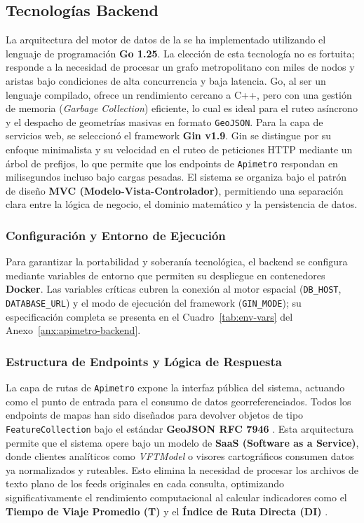 \subsection{Tecnologías Backend}
\label{subsec:backend}
La arquitectura del motor de datos de la \zmvm se ha implementado utilizando el lenguaje de programación \textbf{Go 1.25}. 
La elección de esta tecnología no es fortuita; responde a la necesidad de procesar un grafo metropolitano con miles de nodos y aristas bajo condiciones 
de alta concurrencia y baja latencia. Go, al ser un lenguaje compilado, ofrece un rendimiento cercano a C++, pero con una gestión de memoria (\textit{Garbage Collection}) 
eficiente, lo cual es ideal para el ruteo asíncrono y el despacho de geometrías masivas en formato \texttt{GeoJSON}.
Para la capa de servicios web, se seleccionó el framework \textbf{Gin v1.9}. Gin se distingue por su enfoque minimalista y su velocidad en el ruteo de peticiones HTTP mediante 
un árbol de prefijos, lo que permite que los endpoints de \texttt{Apimetro} respondan en milisegundos incluso bajo cargas pesadas. El sistema se organiza bajo el patrón de diseño 
\textbf{MVC (Modelo-Vista-Controlador)}, permitiendo una separación clara entre la lógica de negocio, el dominio matemático y la persistencia de datos.

\subsubsection{Configuración y Entorno de Ejecución}
\label{subsubsec:configuracionejecucion}

Para garantizar la portabilidad y soberanía tecnológica, el backend se configura mediante variables de entorno que permiten su despliegue en contenedores \textbf{Docker}. Las variables críticas cubren la conexión al motor espacial (\texttt{DB\_HOST}, \texttt{DATABASE\_URL}) y el modo de ejecución del framework (\texttt{GIN\_MODE}); su especificación completa se presenta en el Cuadro~\ref{tab:env-vars} del Anexo~\ref{anx:apimetro-backend}.

\subsubsection{Estructura de Endpoints y Lógica de Respuesta}
\label{subsubsec:estructuraEndpoints}
La capa de rutas de \texttt{Apimetro} expone la interfaz pública del sistema, actuando como el punto de entrada para el consumo de datos georreferenciados. 
Todos los endpoints de mapas han sido diseñados para devolver objetos de tipo \texttt{FeatureCollection} bajo el estándar \textbf{GeoJSON RFC 7946} \parencite{cabrera2025apimetro}. 
Esta arquitectura permite que el sistema opere bajo un modelo de \textbf{SaaS (Software as a Service)}, donde clientes analíticos como \textit{VFTModel} o visores 
cartográficos consumen datos ya normalizados y ruteables. Esto elimina la necesidad de procesar los archivos de texto plano de los feeds \gtfs{} originales en cada consulta, 
optimizando significativamente el rendimiento computacional al calcular indicadores como el \textbf{Tiempo de Viaje Promedio (T)} y el \textbf{Índice de Ruta Directa (DI)} \parencite{cabrera2026VFTModel}.

